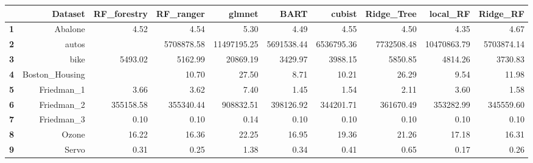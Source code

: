 \begin{table}[ht]
\begin{flushleft}
\begin{tabular}{rrrrrrrrrr}
  \hline
 & Dataset & RF_forestry & RF_ranger & glmnet & BART & cubist & Ridge_Tree & local_RF & Ridge_RF \\ 
  \hline
{\textbf{1}} & Abalone & 4.52 & 4.54 & 5.30 & 4.49 & 4.55 & 4.50 & 4.35 & 4.67 \\ 
  {\textbf{2}} & autos &  & 5708878.58 & 11497195.25 & 5691538.44 & 6536795.36 & 7732508.48 & 10470863.79 & 5703874.14 \\ 
  {\textbf{3}} & bike & 5493.02 & 5162.99 & 20869.19 & 3429.97 & 3988.15 & 5850.85 & 4814.26 & 3730.83 \\ 
  {\textbf{4}} & Boston_Housing &  & 10.70 & 27.50 & 8.71 & 10.21 & 26.29 & 9.54 & 11.98 \\ 
  {\textbf{5}} & Friedman_1 & 3.66 & 3.62 & 7.40 & 1.45 & 1.54 & 2.11 & 3.60 & 1.58 \\ 
  {\textbf{6}} & Friedman_2 & 355158.58 & 355340.44 & 908832.51 & 398126.92 & 344201.71 & 361670.49 & 353282.99 & 345559.60 \\ 
  {\textbf{7}} & Friedman_3 & 0.10 & 0.10 & 0.14 & 0.10 & 0.10 & 0.10 & 0.10 & 0.10 \\ 
  {\textbf{8}} & Ozone & 16.22 & 16.36 & 22.25 & 16.95 & 19.36 & 21.26 & 17.18 & 16.31 \\ 
  {\textbf{9}} & Servo & 0.31 & 0.25 & 1.38 & 0.34 & 0.41 & 0.65 & 0.17 & 0.26 \\ 
   \hline
\end{tabular}
\end{flushleft}
\end{table}
